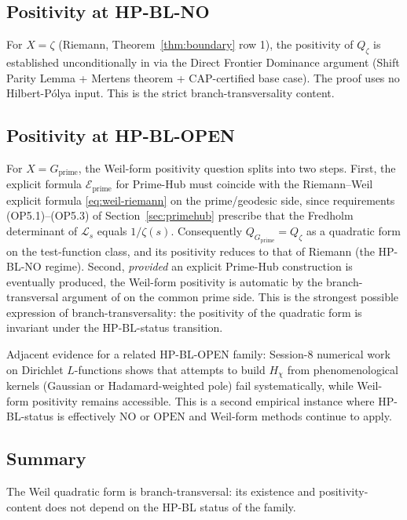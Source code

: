\documentclass[11pt]{article}
\theoremstyle{definition}
\theoremstyle{remark}
\newcommand{\HBL}{\mathrm{HP\text{-}BL}}
\begin{document}
\subsection{Positivity at HP-BL-NO}

For $X = \zeta$ (Riemann, Theorem~\ref{thm:boundary} row 1), the
positivity of $Q_\zeta$ is established unconditionally in
\cite{Geiger2026RHII} via the Direct Frontier Dominance argument
(Shift Parity Lemma + Mertens theorem + CAP-certified base case).
The proof uses no Hilbert-P\'olya input. This is the strict
branch-transversality content.

\subsection{Positivity at HP-BL-OPEN}

For $X = G_\mathrm{prime}$, the Weil-form positivity question splits
into two steps. First, the explicit formula $\mathcal{E}_\mathrm{prime}$
for Prime-Hub must coincide with the Riemann--Weil explicit formula
\eqref{eq:weil-riemann} on the prime/geodesic side, since
requirements (OP5.1)--(OP5.3) of Section~\ref{sec:primehub} prescribe
that the Fredholm determinant of $\mathcal{L}_s$ equals $1/\zeta(s)$.
Consequently $Q_{G_\mathrm{prime}} = Q_\zeta$ as a quadratic form on
the test-function class, and its positivity reduces to that of
Riemann (the HP-BL-NO regime). Second, \emph{provided} an explicit
Prime-Hub construction is eventually produced, the Weil-form
positivity is automatic by the branch-transversal argument of
\cite{Geiger2026RHII} on the common prime side. This is the strongest
possible expression of branch-transversality: the positivity of the
quadratic form is invariant under the $\HBL$-status transition.

Adjacent evidence for a related HP-BL-OPEN family: Session-8
numerical work on Dirichlet $L$-functions
\cite{PaleyWienerDirichlet} shows that attempts to build $H_\chi$
from phenomenological kernels (Gaussian or Hadamard-weighted pole)
fail systematically, while Weil-form positivity remains accessible.
This is a second empirical instance where HP-BL-status is
effectively $\mathrm{NO}$ or $\mathrm{OPEN}$ and Weil-form methods
continue to apply.

\subsection{Summary}

The Weil quadratic form is branch-transversal: its existence and
positivity-content does not depend on the HP-BL status of the family.
\end{document}
